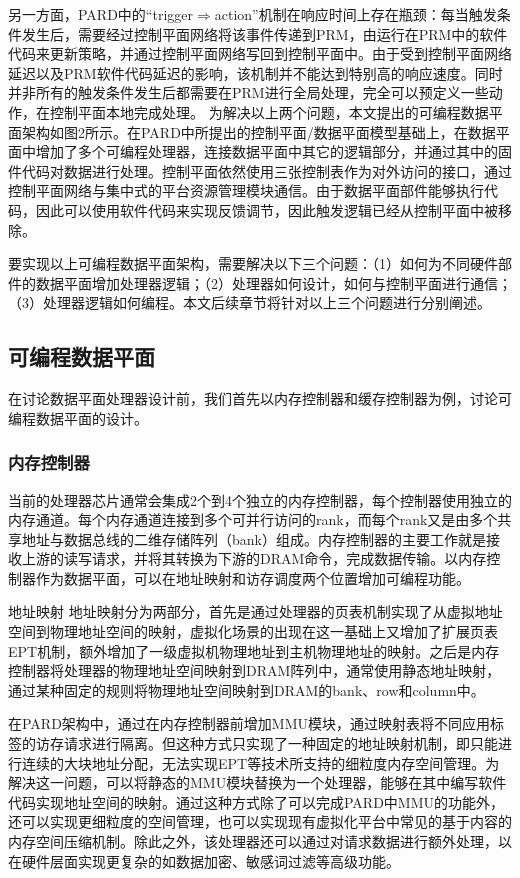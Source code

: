 另一方面，PARD中的``trigger$\Rightarrow$action''机制在响应时间上存在瓶颈：每当触发条件发生后，需要经过控制平面网络将该事件传递到PRM，由运行在PRM中的软件代码来更新策略，并通过控制平面网络写回到控制平面中。由于受到控制平面网络延迟以及PRM软件代码延迟的影响，该机制并不能达到特别高的响应速度。同时并非所有的触发条件发生后都需要在PRM进行全局处理，完全可以预定义一些动作，在控制平面本地完成处理。
为解决以上两个问题，本文提出的可编程数据平面架构如图2所示。在PARD中所提出的控制平面/数据平面模型基础上，在数据平面中增加了多个可编程处理器，连接数据平面中其它的逻辑部分，并通过其中的固件代码对数据进行处理。控制平面依然使用三张控制表作为对外访问的接口，通过控制平面网络与集中式的平台资源管理模块通信。由于数据平面部件能够执行代码，因此可以使用软件代码来实现反馈调节，因此触发逻辑已经从控制平面中被移除。
 
要实现以上可编程数据平面架构，需要解决以下三个问题：（1）如何为不同硬件部件的数据平面增加处理器逻辑；（2）处理器如何设计，如何与控制平面进行通信；（3）处理器逻辑如何编程。本文后续章节将针对以上三个问题进行分别阐述。

\subsection{可编程数据平面}

在讨论数据平面处理器设计前，我们首先以内存控制器和缓存控制器为例，讨论可编程数据平面的设计。

\subsubsection*{内存控制器}
当前的处理器芯片通常会集成2个到4个独立的内存控制器，每个控制器使用独立的内存通道。每个内存通道连接到多个可并行访问的rank，而每个rank又是由多个共享地址与数据总线的二维存储阵列（bank）组成。内存控制器的主要工作就是接收上游的读写请求，并将其转换为下游的DRAM命令，完成数据传输。以内存控制器作为数据平面，可以在地址映射和访存调度两个位置增加可编程功能。

地址映射 地址映射分为两部分，首先是通过处理器的页表机制实现了从虚拟地址空间到物理地址空间的映射，虚拟化场景的出现在这一基础上又增加了扩展页表EPT机制，额外增加了一级虚拟机物理地址到主机物理地址的映射。之后是内存控制器将处理器的物理地址空间映射到DRAM阵列中，通常使用静态地址映射，通过某种固定的规则将物理地址空间映射到DRAM的bank、row和column中。

在PARD架构中，通过在内存控制器前增加MMU模块，通过映射表将不同应用标签的访存请求进行隔离。但这种方式只实现了一种固定的地址映射机制，即只能进行连续的大块地址分配，无法实现EPT等技术所支持的细粒度内存空间管理。为解决这一问题，可以将静态的MMU模块替换为一个处理器，能够在其中编写软件代码实现地址空间的映射。通过这种方式除了可以完成PARD中MMU的功能外，还可以实现更细粒度的空间管理，也可以实现现有虚拟化平台中常见的基于内容的内存空间压缩机制。除此之外，该处理器还可以通过对请求数据进行额外处理，以在硬件层面实现更复杂的如数据加密、敏感词过滤等高级功能。


